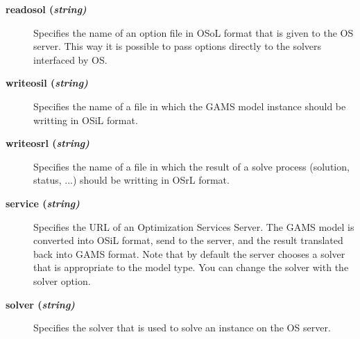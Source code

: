 
\begin{description}

\item[\label{readosol}\hypertarget{readosol}
{\textbf{readosol (\slshape{string})}}]\hspace{1.0in}

Specifies the name of an option file in OSoL format that is given to the OS server.
This way it is possible to pass options directly to the solvers interfaced by OS.


\item[\label{writeosil}\hypertarget{writeosil}
{\textbf{writeosil (\slshape{string})}}]\hspace{1.0in}

Specifies the name of a file in which the GAMS model instance should be writting in OSiL format.


\item[\label{writeosrl}\hypertarget{writeosrl}
{\textbf{writeosrl (\slshape{string})}}]\hspace{1.0in}

Specifies the name of a file in which the result of a solve process (solution, status, ...) should be writting in OSrL format.


\item[\label{service}\hypertarget{service}
{\textbf{service (\slshape{string})}}]\hspace{1.0in}

Specifies the URL of an Optimization Services Server.
The GAMS model is converted into OSiL format, send to the server, and the result translated back into GAMS format.
Note that by default the server chooses a solver that is appropriate to the model type.
You can change the solver with the solver option.


\item[\label{solver}\hypertarget{solver}
{\textbf{solver (\slshape{string})}}]\hspace{1.0in}

Specifies the solver that is used to solve an instance on the OS server.


\end{description}
